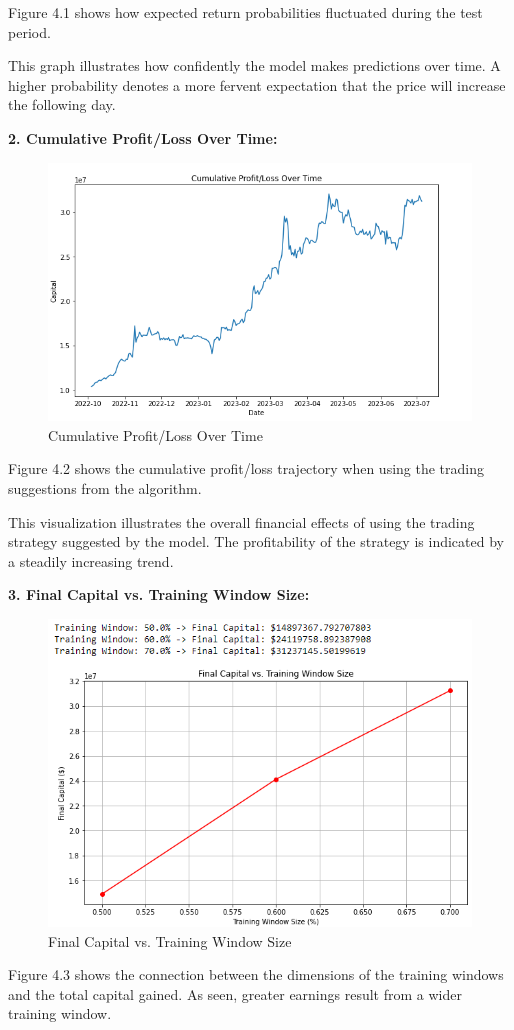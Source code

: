 Figure 4.1 shows how expected return probabilities fluctuated during the test period.

This graph illustrates how confidently the model makes predictions over time. A higher probability denotes a more fervent expectation that the price will increase the following day.

\textbf{2.	Cumulative Profit/Loss Over Time:}

\begin{figure}[H]
\centering
\includegraphics[scale=0.85]{fig6.jpg}
\caption{Cumulative Profit/Loss Over Time}
\label{Cumulative Profit/Loss Over Time}
\end{figure}

Figure 4.2 shows the cumulative profit/loss trajectory when using the trading suggestions from the algorithm.

This visualization illustrates the overall financial effects of using the trading strategy suggested by the model. The profitability of the strategy is indicated by a steadily increasing trend.

\textbf{3.	Final Capital vs. Training Window Size:} 


\begin{figure}[H]
\centering
\includegraphics[scale=0.85]{fig7.jpg}
\caption{Final Capital vs. Training Window Size}
\label{Final Capital vs. Training Window Size}
\end{figure}
Figure 4.3 shows the connection between the dimensions of the training windows and the total capital gained. As seen, greater earnings result from a wider training window.

